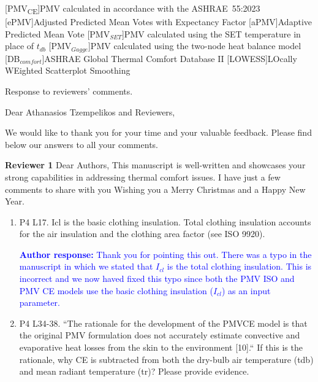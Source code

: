 \documentclass[a4paper, 10pt]{letter}
\newcommand{\response}[1]{\textcolor{blue}{\textbf{Author response:} #1}}
\begin{document}
    [PMV\textsubscript{CE}]{PMV calculated in accordance with the ASHRAE~55:2023}
    [ePMV]{Adjusted Predicted Mean Votes with Expectancy Factor}
    [aPMV]{Adaptive Predicted Mean Vote}
    [PMV$_{SET}$]{PMV calculated using the SET temperature in place of $t_{db}$}
    [PMV$_{Gagge}$]{PMV calculated using the two-node heat balance model}
    [DB$_{comfort}$]{ASHRAE Global Thermal Comfort Database II}
    [LOWESS]{LOcally WEighted Scatterplot Smoothing}

    \renewcommand{\baselinestretch}{1}\normalsize

    \begin{letter}
    {
        Response to reviewers' comments.
    }

        \opening{Dear Athanasios Tzempelikos and Reviewers,}


        We would like to thank you for your time and your valuable feedback.
        Please find below our answers to all your comments.

        \textbf{Reviewer 1}
        Dear Authors,
        This manuscript is well-written and showcases your strong capabilities in addressing thermal comfort issues.
        I have just a few comments to share with you Wishing you a Merry Christmas and a Happy New Year.

        \begin{enumerate}

            \item P4 L17.
            Icl is the basic clothing insulation.
            Total clothing insulation accounts for the air insulation and the clothing area factor (see ISO 9920).

            \response{
                Thank you for pointing this out.
                There was a typo in the manuscript in which we stated that $I_{cl}$ is the total clothing insulation.
                This is incorrect and we now haved fixed this typo since both the PMV ISO and PMV CE models use the basic clothing insulation ($I_{cl}$) as an input parameter.
            }

            \item P4 L34-38.
            ``The rationale for the development of the PMVCE model is that the original PMV
            formulation does not accurately estimate convective and evaporative heat losses from
            the skin to the environment [10].`` If this is the rationale, why CE is subtracted from both
            the dry-bulb air temperature (tdb) and mean radiant temperature (tr)?
            Please provide evidence.


\end{enumerate}
\end{letter}
\end{document}
